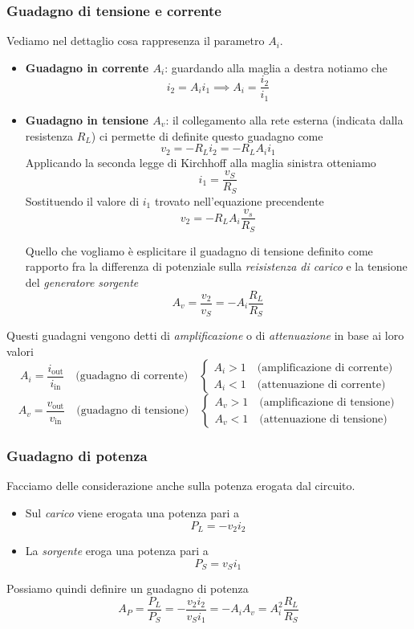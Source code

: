 \documentclass[11pt,a4paper]{article}
\begin{document}
\subsubsection{Guadagno di tensione e corrente}\label{sec:guadagno_di_tensione_e_corrente} %
Vediamo nel dettaglio cosa rappresenza il parametro $A_i$.
\begin{itemize}
    \item \textbf{Guadagno in corrente $A_i$}: guardando alla maglia a destra notiamo che
        \[
            i_2 = A_i i_1 \implies A_i = \frac{i_2}{i_1}
        \]
    \item \textbf{Guadagno in tensione $A_v$}: il collegamento alla rete esterna (indicata dalla
        resistenza $R_L$) ci permette di definite questo guadagno come
        \[
            v_2 = -R_L i_2 = -R_L A_i i_1 
        \]
        Applicando la seconda legge di Kirchhoff alla maglia sinistra otteniamo
        \[
            i_1 = \frac{v_S}{R_S}
        \]
        Sostituendo il valore di $i_1$ trovato nell'equazione precendente 
        \[
            v_2 = -R_L A_i \frac{v_s}{R_S}
        \]

        Quello che vogliamo è esplicitare il guadagno di tensione definito come rapporto
        fra la differenza di potenziale sulla \textit{reisistenza di carico} e la tensione del \textit{generatore sorgente}
        \[
            A_v = \frac{v_2}{v_S} = -A_i\frac{R_L}{R_S}
        \]
\end{itemize}
Questi guadagni vengono detti di \textit{amplificazione} o di \textit{attenuazione} in base ai loro valori
$$
    A_i = \frac{i_\mathrm{out}}{i_\mathrm{in}} \quad \text{(guadagno di corrente)} \quad
    \begin{cases}
        A_i > 1 \quad \text{(amplificazione di corrente)} \\
        A_i < 1 \quad \text{(attenuazione di corrente)}
    \end{cases}
    $$
    \[
    A_v = \frac{v_\mathrm{out}}{v_\mathrm{in}} \quad \text{(guadagno di tensione)} \quad
    \begin{cases}
        A_v > 1 \quad \text{(amplificazione di tensione)} \\
        A_v < 1 \quad \text{(attenuazione di tensione)}
    \end{cases}
    \]
\subsubsection{Guadagno di potenza}\label{sec:guadagno_di_potenza} %
Facciamo delle considerazione anche sulla potenza erogata dal circuito. 
\begin{itemize}
    \item Sul \textit{carico} viene erogata una potenza pari a 
        \[
            P_L = -v_2 i_2
        \]
    \item La \textit{sorgente} eroga una potenza pari a 
        \[
            P_S = v_S i_1
        \]
\end{itemize}
Possiamo quindi definire un guadagno di potenza 
\[
    A_P = \frac{P_L}{P_S} = - \frac{v_2 i_2}{v_S i_1} = -A_i A_v = A_i^2\frac{R_L}{R_S}
\]
\end{document}
